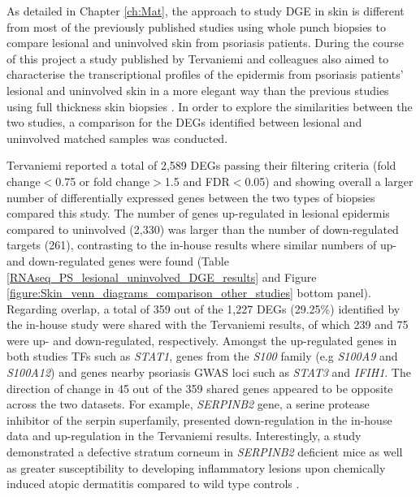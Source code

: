 As detailed in Chapter \ref{ch:Mat}, the approach to study DGE in skin is different from most of the previously published studies using whole punch biopsies to compare lesional and uninvolved skin from psoriasis patients. During the course of this project a study published by Tervaniemi and colleagues also aimed to characterise the transcriptional profiles of the epidermis from psoriasis patients’ lesional and uninvolved skin in a more elegant way than the previous studies using full thickness skin biopsies \parencite{Tervaniemi2016}. %
In order to explore the similarities between the two studies, a comparison for the DEGs identified between lesional and uninvolved matched samples was conducted. 

Tervaniemi reported a total of 2,589 DEGs passing their filtering criteria (fold change$<$0.75 or fold change$>$1.5 and FDR$<$0.05) and showing overall a larger number of differentially expressed genes between the two types of biopsies compared this study. The number of genes up-regulated in lesional epidermis compared to uninvolved (2,330) was larger than the number of down-regulated targets (261), contrasting to the in-house results where similar numbers of up- and down-regulated genes were found (Table \ref{RNAseq_PS_lesional_uninvolved_DGE_results} and Figure \ref{figure:Skin_venn_diagrams_comparison_other_studies} bottom panel). Regarding overlap, a total of 359 out of the 1,227 DEGs (29.25\%) identified by the in-house study were shared with the Tervaniemi results, of which 239 and 75 were up- and down-regulated, respectively. Amongst the up-regulated genes in both studies TFs such as \textit{STAT1}, genes from the \textit{S100} family (e.g \textit{S100A9} and \textit{S100A12}) and genes nearby psoriasis GWAS loci such as \textit{STAT3} and \textit{IFIH1}. The direction of change in 45 out of the 359 shared genes appeared to be opposite across the two datasets. For example, \textit{SERPINB2} gene, a serine protease inhibitor of the serpin superfamily, presented down-regulation in the in-house data and up-regulation in the Tervaniemi results. Interestingly, a study demonstrated a defective stratum corneum in \textit{SERPINB2} deficient mice as well as greater susceptibility to developing inflammatory lesions upon chemically induced atopic dermatitis compared to wild type controls \parencite{Schroder2016}. 


